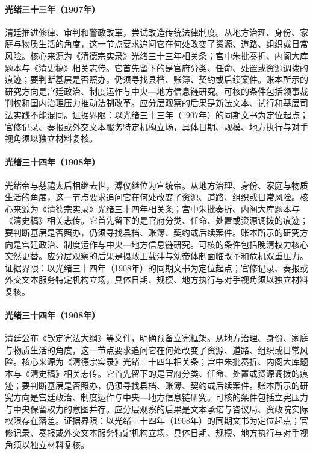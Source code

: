 \hypertarget{social:EQ-1907-QING-LEGAL-REFORM}{}\paragraph{光绪三十三年（1907年）}清廷推进修律、审判和警政改革，尝试改造传统法律制度。从地方治理、身份、家庭与物质生活的角度，这一节点要求追问它在何处改变了资源、道路、组织或日常风险。核心来源为《清德宗实录》光绪三十三年相关条；宫中朱批奏折、内阁大库题本与《清史稿》相关志传。它首先留下的是官府分类、任命、处置或资源调拨的痕迹；要判断基层是否照办，仍须寻找县档、账簿、契约或后续案件。账本所示的研究方向是宫廷政治、制度运作与中央—地方信息链研究。可核的条件包括领事裁判权和国内治理压力推动法制改革。应分层观察的后果是新法文本、试行和基层司法实践不能混同。证据界限：以光绪三十三年（1907年）的同期文书为定位起点；官修记录、奏报或外交文本服务特定机构立场，具体日期、规模、地方执行与对手视角须以独立材料复核。
\hypertarget{social:EQ-1908-GUANGXU-CIXI-DEATHS}{}\paragraph{光绪三十四年（1908年）}光绪帝与慈禧太后相继去世，溥仪继位为宣统帝。从地方治理、身份、家庭与物质生活的角度，这一节点要求追问它在何处改变了资源、道路、组织或日常风险。核心来源为《清德宗实录》光绪三十四年相关条；宫中朱批奏折、内阁大库题本与《清史稿》相关志传。它首先留下的是官府分类、任命、处置或资源调拨的痕迹；要判断基层是否照办，仍须寻找县档、账簿、契约或后续案件。账本所示的研究方向是宫廷政治、制度运作与中央—地方信息链研究。可核的条件包括晚清权力核心突然更替。应分层观察的后果是摄政王载沣与幼帝体制面临改革和危机双重压力。证据界限：以光绪三十四年（1908年）的同期文书为定位起点；官修记录、奏报或外交文本服务特定机构立场，具体日期、规模、地方执行与对手视角须以独立材料复核。
\hypertarget{social:EQ-1908-CONSTITUTIONAL-OUTLINE}{}\paragraph{光绪三十四年（1908年）}清廷公布《钦定宪法大纲》等文件，明确预备立宪框架。从地方治理、身份、家庭与物质生活的角度，这一节点要求追问它在何处改变了资源、道路、组织或日常风险。核心来源为《清德宗实录》光绪三十四年相关条；宫中朱批奏折、内阁大库题本与《清史稿》相关志传。它首先留下的是官府分类、任命、处置或资源调拨的痕迹；要判断基层是否照办，仍须寻找县档、账簿、契约或后续案件。账本所示的研究方向是宫廷政治、制度运作与中央—地方信息链研究。可核的条件包括立宪压力与中央保留权力的意图并存。应分层观察的后果是文本承诺与咨议局、资政院实际权限存在落差。证据界限：以光绪三十四年（1908年）的同期文书为定位起点；官修记录、奏报或外交文本服务特定机构立场，具体日期、规模、地方执行与对手视角须以独立材料复核。
